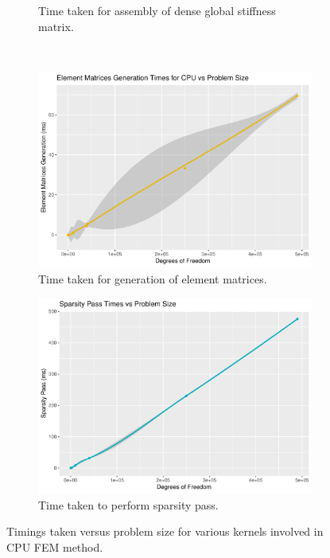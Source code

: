 \begin{figure}
\begin{subfigure}{0.48\linewidth}
		\caption{Time taken for assembly of dense global stiffness matrix.}
		\label{fig:assem_dense}
	\end{subfigure}\\
	\begin{subfigure}{0.48\linewidth}
		\centering
		\includegraphics[width=\linewidth]{Plots/elem_mats_cpu}
		\caption{Time taken for generation of element matrices.}
		\label{fig:elems_sparse}
	\end{subfigure}\hfill
	\begin{subfigure}{0.48\linewidth}
		\centering
		\includegraphics[width=\linewidth]{Plots/sparsity_pass_cpu}
		\caption{Time taken to perform sparsity pass.}
		\label{fig:sparsity_scan}
	\end{subfigure}
	\caption{Timings taken versus problem size for various kernels involved in CPU FEM method.}
	\label{fig:kerns}
\end{figure}

